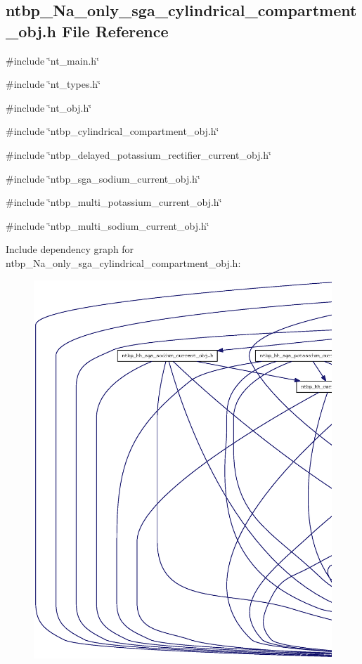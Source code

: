 \subsection{ntbp\_\-Na\_\-only\_\-sga\_\-cylindrical\_\-compartment\_\-obj.h File Reference}
\label{ntbp___na__only__sga__cylindrical__compartment__obj_8h}
{\ttfamily \#include \char`\"{}nt\_\-main.h\char`\"{}}\par
{\ttfamily \#include \char`\"{}nt\_\-types.h\char`\"{}}\par
{\ttfamily \#include \char`\"{}nt\_\-obj.h\char`\"{}}\par
{\ttfamily \#include \char`\"{}ntbp\_\-cylindrical\_\-compartment\_\-obj.h\char`\"{}}\par
{\ttfamily \#include \char`\"{}ntbp\_\-delayed\_\-potassium\_\-rectifier\_\-current\_\-obj.h\char`\"{}}\par
{\ttfamily \#include \char`\"{}ntbp\_\-sga\_\-sodium\_\-current\_\-obj.h\char`\"{}}\par
{\ttfamily \#include \char`\"{}ntbp\_\-multi\_\-potassium\_\-current\_\-obj.h\char`\"{}}\par
{\ttfamily \#include \char`\"{}ntbp\_\-multi\_\-sodium\_\-current\_\-obj.h\char`\"{}}\par
Include dependency graph for ntbp\_\-Na\_\-only\_\-sga\_\-cylindrical\_\-compartment\_\-obj.h:
\nopagebreak
\begin{figure}[H]
\begin{center}
\leavevmode
\includegraphics[width=400pt]{ntbp___na__only__sga__cylindrical__compartment__obj_8h__incl}
\end{center}
\end{figure}
